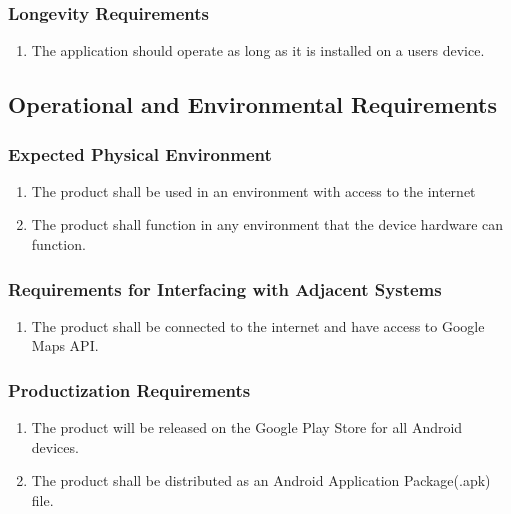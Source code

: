 \documentclass[]{article}
\begin{document}
\subsubsection{Longevity Requirements}
\label{ssub:longevity_requirements}
\begin{enumerate}[{PR}1. ]
	\item The application should operate as long as it is installed on a users device.
\end{enumerate}


\subsection{Operational and Environmental Requirements}
\label{sub:operational_and_environmental_requirements}

\subsubsection{Expected Physical Environment}
\label{ssub:expected_physical_environment}
\begin{enumerate}[{OE}1. ]
	\item The product shall be used in an environment with access to the internet
	\item The product shall function in any environment that the device hardware can function.
\end{enumerate}

\subsubsection{Requirements for Interfacing with Adjacent Systems}
\label{ssub:requirements_for_interfacing_with_adjacent_systems}
\begin{enumerate}[{SR}1. ]
	\item The product shall be connected to the internet and have access to Google Maps API.
\end{enumerate}

\subsubsection{Productization Requirements}
\label{ssub:productization_requirements}
\begin{enumerate}[{OE}1. ]
	\item The product will be released on the Google Play Store for all Android devices.
	\item The product shall be distributed as an Android Application Package(.apk) file.
\end{enumerate}
\end{document}
